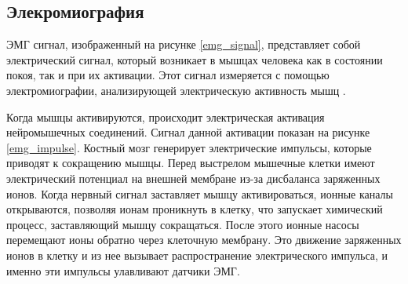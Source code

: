\subsection{Элекромиография}

ЭМГ сигнал, изображенный на рисунке \ref{emg_signal}, представляет собой электрический сигнал, который возникает в мышцах человека как в состоянии покоя, так и при их активации. Этот сигнал измеряется с помощью электромиографии, анализирующей электрическую активность мышц \cite{bib:EMG:3}.


Когда мышцы активируются, происходит электрическая активация нейромышечных соединений. Сигнал данной активации показан на рисунке \ref{emg_impulse}. Костный мозг генерирует электрические импульсы, которые приводят к сокращению мышцы. Перед выстрелом мышечные клетки имеют электрический потенциал на внешней мембране из-за дисбаланса заряженных ионов. Когда нервный сигнал заставляет мышцу активироваться, ионные каналы открываются, позволяя ионам проникнуть в клетку, что запускает химический процесс, заставляющий мышцу сокращаться. После этого ионные насосы перемещают ионы обратно через клеточную мембрану. Это движение заряженных ионов в клетку и из нее вызывает распространение электрического импульса, и именно эти импульсы улавливают датчики ЭМГ.

